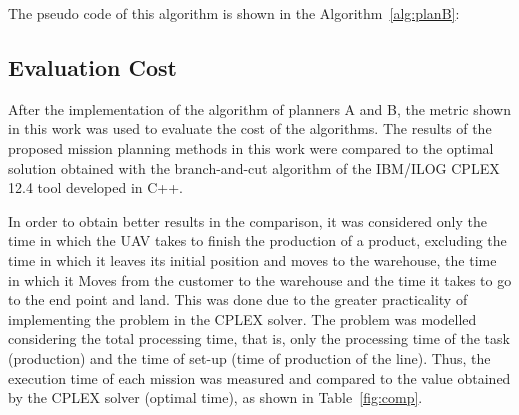 \documentclass[conference,harvard,brazil,english]{sbatex}
\begin{document}
The pseudo code of this algorithm is shown in the Algorithm~\ref{alg:planB}:

\begin{center}
\end{center}

\subsection{Evaluation Cost}
\label{sec:acusto}

After the implementation of the algorithm of planners A and B, the metric shown in this work was used to evaluate the cost of the algorithms. The results of the proposed mission planning methods in this work were compared to the optimal solution obtained with the branch-and-cut algorithm of the IBM/ILOG CPLEX 12.4 tool developed in C++.

In order to obtain better results in the comparison, it was considered only the time in which the UAV takes to finish the production of a product, excluding the time in which it leaves its initial position and moves to the warehouse, the time in which it Moves from the customer to the warehouse and the time it takes to go to the end point and land. This was done due to the greater practicality of implementing the problem in the CPLEX solver. The problem was modelled considering the total processing time, that is, only the processing time of the task (production) and the time of set-up (time of production of the line). Thus, the execution time of each mission was measured and compared to the value obtained by the CPLEX solver (optimal time), as shown in Table~\ref{fig:comp}.
\end{document}
